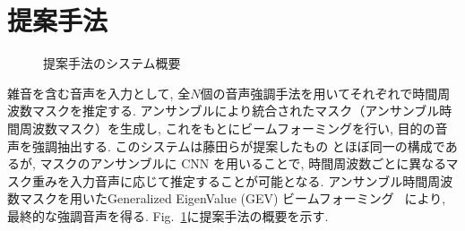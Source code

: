 \documentclass[a4j,10pt,uplatex]{jsarticle}
\begin{document}
\section{提案手法}
\begin{figure}[t]
 \centering
 \caption{提案手法のシステム概要} 
 \label{system}
\end{figure}
雑音を含む音声を入力として,
全$N$個の音声強調手法を用いてそれぞれで時間周波数マスクを推定する.
アンサンブルにより統合されたマスク（アンサンブル時間周波数マスク）を生成し,
これをもとにビームフォーミングを行い, 目的の音声を強調抽出する.
このシステムは藤田らが提案したもの
とほぼ同一の構成であるが,
マスクのアンサンブルに CNN を用いることで,  
時間周波数ごとに異なるマスク重みを入力音声に応じて推定することが可能となる. 
アンサンブル時間周波数マスクを用いたGeneralized EigenValue (GEV) ビームフォーミング~\cite{Hey2016} により,
最終的な強調音声を得る.
Fig.~\ref{system}に提案手法の概要を示す.
\end{document}
